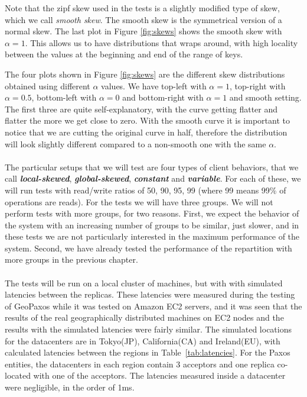 Note that the zipf skew used in the tests is a slightly modified type of skew, which we call \emph{smooth skew}. The smooth skew is the symmetrical version of a normal skew. The last plot in Figure \ref{fig:skews} shows the smooth skew with $\alpha=1$. This allows us to have distributions that wraps around, with high locality between the values at the beginning and end of the range of keys.

The four plots shown in Figure \ref{fig:skews} are the different skew distributions obtained using different $\alpha$ values. We have top-left with $\alpha = 1$, top-right with $\alpha = 0.5$, bottom-left with $\alpha = 0$ and bottom-right with $\alpha = 1$ and smooth setting. The first three are quite self-explanatory, with the curve getting flatter and flatter the more we get close to zero. With the smooth curve it is important to notice that we are cutting the original curve in half, therefore the distribution will look slightly different compared to a non-smooth one with the same $\alpha$.
\\\\
The particular setups that we will test are four types of client behaviors, that we call \textbf{\emph{local-skewed}}, \textbf{\emph{global-skewed}}, \textbf{\emph{constant}} and \textbf{\emph{variable}}. For each of these, we will run tests with read/write ratios of 50, 90, 95, 99 (where 99 means 99\% of operations are  reads). For the tests we will have three groups. We will not perform tests with more groups, for two reasons. First, we expect the behavior of the system with an increasing number of groups to be similar, just slower, and in these tests we are not particularly interested in the maximum performance of the system. Second, we have already tested the performance of the repartition with more groups in the previous chapter.
\\\\
The tests will be run on a local cluster of machines, but with with simulated latencies between the replicas. These latencies were measured during the testing of GeoPaxos \citep{geopaxos} while it was tested on Amazon EC2 servers, and it was seen that the results of the real geographically distributed machines on EC2 nodes and the results with the simulated latencies were fairly similar. The simulated locations for the datacenters are in Tokyo(JP), California(CA) and Ireland(EU), with calculated latencies between the regions in Table~\ref{tab:latencies}. For the Paxos entities, the datacenters in each region contain 3 acceptors and one replica co-located with one of the acceptors. The latencies measured inside a datacenter were negligible, in the order of 1ms.


